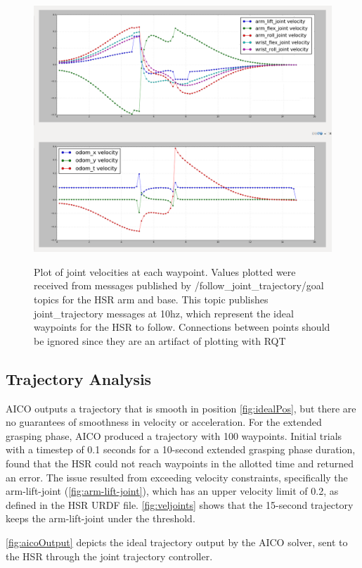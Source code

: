 \documentclass[11pt]{article}
\begin{document}
        \begin{figure}
            \centering
            \includegraphics[width=0.95\linewidth]{2020.03.31/hsr_driveby_trajectory_velocities_fixed.png}
            \label{fig:idealVel}
            \caption{Plot of joint velocities at each waypoint. Values plotted were received from messages published by /follow\_joint\_trajectory/goal topics for the HSR arm and base. This topic publishes joint\_trajectory messages at 10hz, which represent the ideal waypoints for the HSR to follow. Connections between points should be ignored since they are an artifact of plotting with RQT}
        \end{figure}

        \subsection{Trajectory Analysis}
            AICO outputs a trajectory that is smooth in position \cref{fig:idealPos}, but there are no guarantees of smoothness in velocity or acceleration. For the extended grasping phase, AICO produced a trajectory with 100 waypoints. Initial trials with a timestep of 0.1 seconds for a 10-second extended grasping phase duration, found that the HSR could not reach waypoints in the allotted time and returned an error. The issue resulted from exceeding velocity constraints, specifically the arm-lift-joint (\cref{fig:arm-lift-joint}), which has an upper velocity limit of 0.2, as defined in the HSR URDF file. \cref{fig:veljoints} shows that the 15-second trajectory keeps the arm-lift-joint under the threshold.

            \cref{fig:aicoOutput} depicts the ideal trajectory output by the AICO solver, sent to the HSR through the joint trajectory controller.
\end{document}
